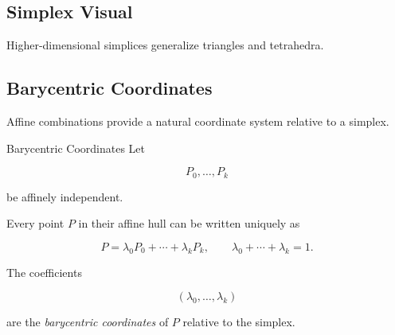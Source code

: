 \subsection{Simplex Visual}
\label{subsec:simplex-visual}

\begin{centereddiagram}
\end{centereddiagram}

Higher-dimensional simplices generalize triangles and tetrahedra.

\subsection{Barycentric Coordinates}
\label{subsec:barycentric-coordinates}

Affine combinations provide a natural coordinate system relative to a
simplex.

\begin{definitionbox}{Barycentric Coordinates}
Let

\[ P_0,\ldots,P_k \]

be affinely independent.

Every point \(P\) in their affine hull can be written uniquely as

\[
\boxed{
P=\lambda_0P_0+\cdots+\lambda_kP_k,
\qquad
\lambda_0+\cdots+\lambda_k=1.
}
\]

The coefficients

\[ (\lambda_0,\ldots,\lambda_k) \]

are the \emph{barycentric coordinates} of \(P\) relative to the simplex.
\end{definitionbox}

